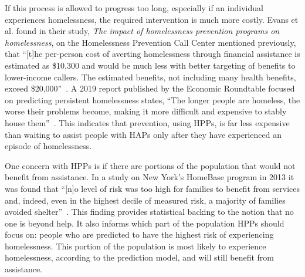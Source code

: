 \documentclass[10pt,letterpaper]{article}
\begin{document}
If this process is allowed to progress too long, especially if an individual experiences homelessness, the required intervention is much more costly. Evans et al. found in their study, \textit{The impact of homelessness prevention programs on homelessness}, on the Homelessness Prevention Call Center mentioned previously, that ``[t]he per-person cost of averting homelessness through financial assistance is estimated as \$10,300 and would be much less with better targeting of benefits to lower-income callers. The estimated benefits, not including many health benefits, exceed \$20,000''~\cite{evans2016impact}. A 2019 report published by the Economic Roundtable focused on predicting persistent homelessness states, ``The longer people are homeless, the worse their problems become, making it more difficult and expensive to stably house them''~\cite{toros2019early}. This indicates that prevention, using HPPs, is far less expensive than waiting to assist people with HAPs only after they have experienced an episode of homelessness.

One concern with HPPs is if there are portions of the population that would not benefit from assistance. In a study on New York's HomeBase program in 2013 it was found that ``[n]o level of risk was too high for families to benefit from services and, indeed, even in the highest decile of measured risk, a majority of families avoided shelter''~\cite{shinn2013efficient}. This finding provides statistical backing to the notion that no one is beyond help. It also informs which part of the population HPPs should focus on: people who are predicted to have the highest risk of experiencing homelessness. This portion of the population is most likely to experience homelessness, according to the prediction model, and will still benefit from assistance.
\end{document}
